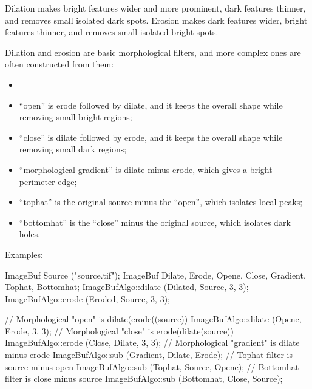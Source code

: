 Dilation makes bright features wider and more prominent, dark features
thinner, and removes small isolated dark spots. Erosion makes dark features
wider, bright features thinner, and removes small isolated bright spots.

Dilation and erosion are basic morphological filters, and more complex ones
are often constructed from them:
\begin{itemize}
\item
\item ``open'' is erode followed by dilate, and it keeps the overall shape
while removing small bright regions;
\item ``close'' is dilate followed by erode, and it keeps the overall shape
while removing small dark regions;
\item ``morphological gradient'' is dilate minus erode, which gives a
bright perimeter edge;
\item ``tophat'' is the original source minus the ``open'', which isolates
local peaks;
\item ``bottomhat'' is the ``close'' minus the original source, which
isolates dark holes.
\end{itemize}

\smallskip
\noindent Examples:
\begin{code}
    ImageBuf Source ("source.tif");
    ImageBuf Dilate, Erode, Opene, Close, Gradient, Tophat, Bottomhat;
    ImageBufAlgo::dilate (Dilated, Source, 3, 3);
    ImageBufAlgo::erode (Eroded, Source, 3, 3);

    // Morphological "open" is dilate(erode((source))
    ImageBufAlgo::dilate (Opene, Erode, 3, 3);
    // Morphological "close" is erode(dilate(source))
    ImageBufAlgo::erode (Close, Dilate, 3, 3);
    // Morphological "gradient" is dilate minus erode
    ImageBufAlgo::sub (Gradient, Dilate, Erode);
    // Tophat filter is source minus open
    ImageBufAlgo::sub (Tophat, Source, Opene);
    // Bottomhat filter is close minus source
    ImageBufAlgo::sub (Bottomhat, Close, Source);
\end{code}

